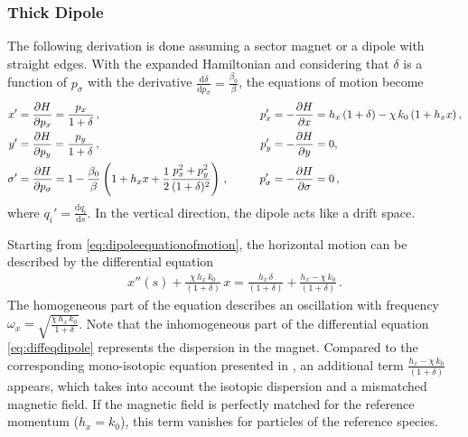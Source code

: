 \subsubsection{Thick Dipole}
%
The following derivation is done assuming a sector magnet or a dipole with straight edges. With the expanded Hamiltonian and considering that $\delta$ is a function of $p_\sigma$ with the derivative $\frac{\mathrm{d} \delta}{\mathrm{d} p_\sigma} = \frac{\beta_0}{\beta}$, the equations of motion become
%
%
\begin{alignat}{4}
  x' &=  \frac{\partial H}{\partial p_x} = \frac{p_x}{1+\delta} \,, \quad \quad \quad \quad &p_x' &= -\frac{\partial H}{\partial x} = h_x \, (1+\delta) - \chi \, k_0 \, (1+h_x x)  \, , \label{eq:dipoleequationofmotion}  \\ 
  y' &= \frac{\partial H}{\partial p_y} = \frac{p_y}{1+\delta} \,, \quad \quad &p_y' &= -\frac{\partial H}{\partial y} = 0 ,   \label{eq:dipoleequationofmotiony}\\
  \sigma' &=  \frac{\partial H}{\partial p_\sigma} =  1 - \frac{\beta_0}{\beta} \left( 1+h_x x + \frac{1}{2} \frac{p_x^2 + p_y^2}{(1+\delta)^2} \right) \,, \quad \quad  &p_\sigma' &= -\frac{\partial H}{\partial \sigma} = 0 \, ,   \label{eq:dipoleequationofmotionz}
\end{alignat}
%
where $q_i' = \frac{\mathrm{d} q_i}{\mathrm{d} s}$. In the vertical direction, the dipole acts like a drift space. 

Starting from \eqref{eq:dipoleequationofmotion}, the horizontal motion can be described by the differential equation
\begin{align}
x''(s) + \frac{\chi \, h_x \, k_0}{(1+\delta)} \, x = \frac{h_x \, \delta}{(1+\delta)} + \frac{h_x - \chi \, k_0}{(1+\delta)} \, . \label{eq:diffeqdipole}
\end{align}
%
The homogeneous part of the equation describes an oscillation with frequency $\omega_x=\sqrt{\frac{\chi \, h_x \, k_0}{1+\delta}}$. Note that the inhomogeneous part of the differential equation \eqref{eq:diffeqdipole} represents the dispersion in the magnet. Compared to the corresponding mono-isotopic equation presented in \cite{DESY-95-189}, an additional term $\frac{h_x - \chi \, k_0}{(1+\delta)}$ appears, which takes into account the isotopic dispersion and a mismatched magnetic field. If the magnetic field is perfectly matched for the reference momentum ($h_x=k_0$), this term vanishes for particles of the reference species. 
%
%

